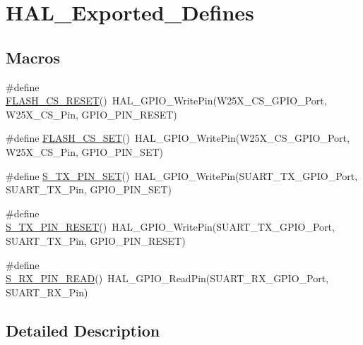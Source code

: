 \hypertarget{group___h_a_l___exported___defines}{}\section{H\+A\+L\+\_\+\+Exported\+\_\+\+Defines}
\label{group___h_a_l___exported___defines}
\subsection*{Macros}
\begin{DoxyCompactItemize}
\item 
\#define \mbox{\hyperlink{group___h_a_l___exported___defines_ga3df8c78e1d68d69f629630fb6095cec1}{F\+L\+A\+S\+H\+\_\+\+C\+S\+\_\+\+R\+E\+S\+ET}}()~H\+A\+L\+\_\+\+G\+P\+I\+O\+\_\+\+Write\+Pin(W25\+X\+\_\+\+C\+S\+\_\+\+G\+P\+I\+O\+\_\+\+Port, W25\+X\+\_\+\+C\+S\+\_\+\+Pin, G\+P\+I\+O\+\_\+\+P\+I\+N\+\_\+\+R\+E\+S\+ET)
\item 
\#define \mbox{\hyperlink{group___h_a_l___exported___defines_gadc9743a09abcf9e1d203bdd5081db24a}{F\+L\+A\+S\+H\+\_\+\+C\+S\+\_\+\+S\+ET}}()~H\+A\+L\+\_\+\+G\+P\+I\+O\+\_\+\+Write\+Pin(W25\+X\+\_\+\+C\+S\+\_\+\+G\+P\+I\+O\+\_\+\+Port, W25\+X\+\_\+\+C\+S\+\_\+\+Pin, G\+P\+I\+O\+\_\+\+P\+I\+N\+\_\+\+S\+ET)
\item 
\#define \mbox{\hyperlink{group___h_a_l___exported___defines_gac5645a8f806359e621559359dadfc7c5}{S\+\_\+\+T\+X\+\_\+\+P\+I\+N\+\_\+\+S\+ET}}()~H\+A\+L\+\_\+\+G\+P\+I\+O\+\_\+\+Write\+Pin(S\+U\+A\+R\+T\+\_\+\+T\+X\+\_\+\+G\+P\+I\+O\+\_\+\+Port, S\+U\+A\+R\+T\+\_\+\+T\+X\+\_\+\+Pin, G\+P\+I\+O\+\_\+\+P\+I\+N\+\_\+\+S\+ET)
\item 
\#define \mbox{\hyperlink{group___h_a_l___exported___defines_gadd41bc5ddcf6f842928efc4f0d944a57}{S\+\_\+\+T\+X\+\_\+\+P\+I\+N\+\_\+\+R\+E\+S\+ET}}()~H\+A\+L\+\_\+\+G\+P\+I\+O\+\_\+\+Write\+Pin(S\+U\+A\+R\+T\+\_\+\+T\+X\+\_\+\+G\+P\+I\+O\+\_\+\+Port, S\+U\+A\+R\+T\+\_\+\+T\+X\+\_\+\+Pin, G\+P\+I\+O\+\_\+\+P\+I\+N\+\_\+\+R\+E\+S\+ET)
\item 
\#define \mbox{\hyperlink{group___h_a_l___exported___defines_gac1fbe03efbe22feb97f198a4dd8b1237}{S\+\_\+\+R\+X\+\_\+\+P\+I\+N\+\_\+\+R\+E\+AD}}()~H\+A\+L\+\_\+\+G\+P\+I\+O\+\_\+\+Read\+Pin(S\+U\+A\+R\+T\+\_\+\+R\+X\+\_\+\+G\+P\+I\+O\+\_\+\+Port, S\+U\+A\+R\+T\+\_\+\+R\+X\+\_\+\+Pin)
\end{DoxyCompactItemize}


\subsection{Detailed Description}


